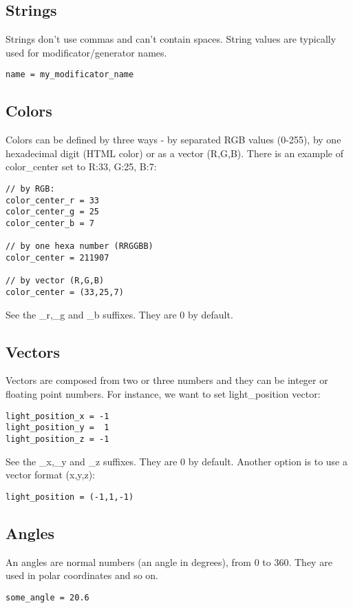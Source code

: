 \documentclass[9pt]{article}
\begin{document}
\subsection{Strings}

Strings don't use commas and can't contain spaces. String values are typically 
used for modificator/generator names.

\begin{verbatim}
name = my_modificator_name
\end{verbatim}

\subsection{Colors}
Colors can be defined by three ways - by separated RGB values (0-255),
by one hexadecimal digit (HTML color) or as a vector (R,G,B). There is an example
of color\_center set to R:33, G:25, B:7:
\begin{verbatim}
// by RGB:
color_center_r = 33
color_center_g = 25
color_center_b = 7

// by one hexa number (RRGGBB)
color_center = 211907

// by vector (R,G,B)
color_center = (33,25,7) 
\end{verbatim}
See the \_r,\_g and \_b suffixes. They are 0 by default.

\subsection{Vectors}

Vectors are composed from two or three numbers and they
can be integer or floating point numbers. For instance, we want to 
set light\_position vector:
\begin{verbatim}
light_position_x = -1
light_position_y =  1
light_position_z = -1
\end{verbatim}
See the \_x,\_y and \_z suffixes. They are 0 by default. Another option is
to use a vector format (x,y,z):
\begin{verbatim}
light_position = (-1,1,-1)
\end{verbatim}

\subsection{Angles}

An angles are normal numbers (an angle in degrees), from 0 to 360. 
They are used in polar coordinates and so on.
\begin{verbatim}
some_angle = 20.6
\end{verbatim}
\end{document}
